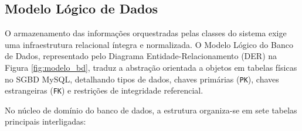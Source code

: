 \clearpage

\subsection{Modelo Lógico de Dados}

O armazenamento das informações orquestradas pelas classes do sistema exige uma infraestrutura relacional íntegra e normalizada. O Modelo Lógico do Banco de Dados, representado pelo Diagrama Entidade-Relacionamento (DER) na Figura \ref{fig:modelo_bd}, traduz a abstração orientada a objetos em tabelas físicas no SGBD MySQL, detalhando tipos de dados, chaves primárias (\texttt{PK}), chaves estrangeiras (\texttt{FK}) e restrições de integridade referencial.

No núcleo de domínio do banco de dados, a estrutura organiza-se em sete tabelas principais interligadas:
